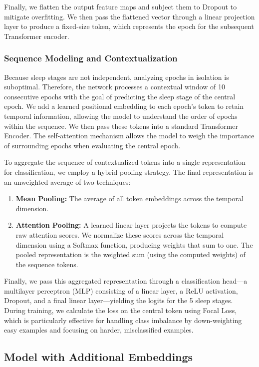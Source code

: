 Finally, we flatten the output feature maps and subject them
to Dropout to mitigate overfitting. We then pass the flattened vector
through a linear projection layer to produce a fixed-size token,
which represents the epoch for the subsequent Transformer encoder.

\subsubsection*{Sequence Modeling and Contextualization}
Because sleep stages are not independent, analyzing epochs in isolation is suboptimal.
Therefore, the network processes a contextual window of 10 consecutive epochs with the goal of predicting the sleep stage of the central epoch.
We add a learned positional embedding to each epoch's token to retain temporal information, allowing the model to understand the order of epochs within the sequence.
We then pass these tokens into a standard Transformer Encoder.
The self-attention mechanism allows the model to weigh the importance of surrounding epochs when evaluating the central epoch.

To aggregate the sequence of contextualized tokens into a single representation for classification, we employ a hybrid pooling strategy. The final representation is an unweighted average of two techniques:
\begin{enumerate}
\item \textbf{Mean Pooling:} The average of all token embeddings across the temporal dimension.
\item \textbf{Attention Pooling:} A learned linear layer projects the tokens to compute raw attention scores. We normalize these scores across the temporal dimension using a Softmax function, 
producing weights that sum to one. The pooled representation is the weighted sum (using the computed weights) of the sequence tokens.
\end{enumerate}

Finally, we pass this aggregated representation through a classification head—a multilayer perceptron (MLP) consisting of a linear layer, a ReLU activation, Dropout, and a final linear layer—yielding the logits for the 5 sleep stages.
During training, we calculate the loss on the central token using Focal Loss, which is particularly effective for handling class imbalance by down-weighting easy examples and focusing on harder, misclassified examples.

\subsection{Model with Additional Embeddings} \label{sec:additional_embeddings}

